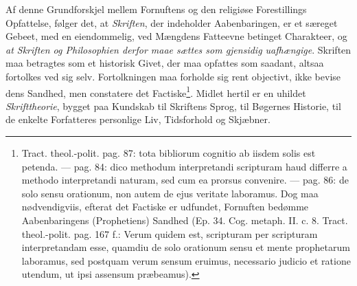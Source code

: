 \documentclass[12pt,a4paper]{book}
\newcommand{\opage}[1]{\marginnote{\footnotesize\textit{[#1]}}}
\begin{document}
Af denne Grundforskjel mellem Fornuftens og den religiøse Forestillings Opfattelse, følger det, at \emph{Skriften}, der indeholder Aabenbaringen, er et særeget Gebeet, med en eiendommelig, ved Mængdens Fatteevne betinget Charakteer, og \emph{at Skriften og Philosophien derfor maae sættes som gjensidig uafhængige}. Skriften maa betragtes som et historisk Givet, der maa opfattes som saadant, altsaa fortolkes ved sig selv. Fortolkningen maa forholde sig rent objectivt, ikke bevise dens Sandhed, men constatere det Factiske\footnote{Tract. theol.-polit. pag. 87: tota bibliorum cognitio ab iisdem solis est petenda. --- pag. 84: dico methodum interpretandi scripturam haud differre a methodo interpretandi naturam, sed cum ea prorsus convenire. --- pag. 86: de solo sensu orationum, non autem de ejus veritate laboramus. Dog maa nødvendigviis, efterat det Factiske er udfundet, Fornuften bedømme Aabenbaringens (Prophetiens) Sandhed (Ep. 34. Cog. metaph. II. c. 8. Tract. theol.-polit. pag. 167 f.: Verum quidem est, scripturam per scripturam interpretandam esse, quamdiu de solo orationum sensu et mente prophetarum laboramus, sed postquam verum sensum eruimus, necessario judicio et ratione utendum, ut ipsi assensum præbeamus).}. Midlet hertil er en uhildet \emph{Skrifttheorie},
\opage{155} \setcounter{footnote}{0}%
bygget paa Kundskab til Skriftens Sprog, til Bøgernes Historie, til de enkelte Forfatteres personlige Liv, Tidsforhold og Skjæbner.
\end{document}

